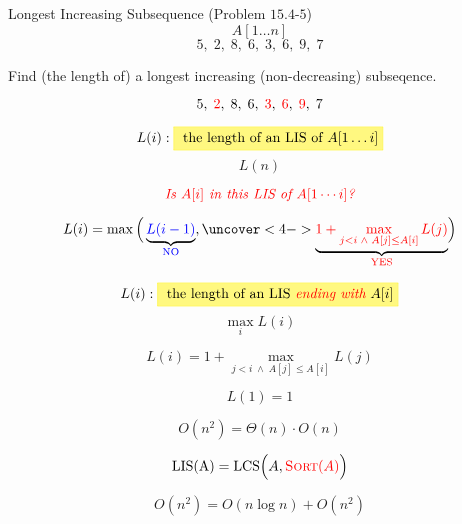 
\begin{frame}{}
  \begin{exampleblock}{Longest Increasing Subsequence (Problem $15.4$-$5$)}
    \[
      A[1 \ldots n] 
    \]
    \[
      5,\; 2,\; 8,\; 6,\; 3,\; 6,\; 9,\; 7 
    \]

    \vspace{0.20cm}
    \begin{center}
      Find (the length of) a longest increasing (non-decreasing) subseqence.
    \end{center}
    \[
      5,\; \textcolor{red}{2},\; 8,\; 6,\; \textcolor{red}{3},\; \textcolor{red}{6},\; \textcolor{red}{9},\; 7 
    \]
  \end{exampleblock}
\end{frame}

\begin{frame}{}
  \[
    L(i): \hl{yellow}{\text{ the length of an LIS of $A[1 \ldots i]$}}
  \]
  \[
    L(n)
  \]

  \pause
  \vspace{0.30cm}
  \[
    \text{\textcolor{red}{\it Is $A[i]$ in this LIS of $A[1 \cdots i]$?}}
  \]

  \pause
  \vspace{0.30cm}
  \[
    L(i) = \max \Big(\underbrace{\blue{L(i-1)}}_{\blue{\text{NO}}},
      \uncover<4->{\underbrace{\red{1 + \max_{j < i \;\land\; A[j] \le A[i]} L(j)}}_{\red{\text{YES}}}}\Big)
  \]

\end{frame}

\begin{frame}{}
  \[
    L(i): \hl{yellow}{\text{ the length of an LIS \red{\it ending with} $A[i]$}}
  \]
  \[
    \max\limits_{i} L(i)
  \]

  \pause
  \begin{center}
  \end{center}

  \pause
  \[
    L(i) = 1 + \max_{j < i \;\land\; A[j] \le A[i]} L(j)
  \]

  \pause
  \[
    L(1) = 1
  \]

  \pause
  \[
    O(n^2) = \Theta(n) \cdot O(n)
  \]
\end{frame}

\begin{frame}{}
  \[
    \text{LIS(A)} = \text{LCS} \Big(A, \textcolor{red}{\textsc{Sort}(A)} \Big)
  \]

  \pause
  \[
    O(n^2) = O(n \log n) + O(n^2)
  \]
\end{frame}

